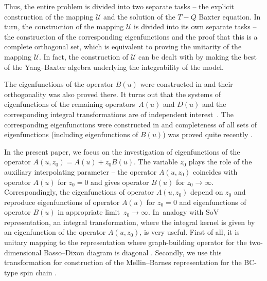 \documentclass[pdftex]{sigma}
\numberwithin{equation}{section}
\begin{document}
Thus, the entire problem is divided into two separate tasks -- the explicit
construction of the mapping $\mathcal{U}$ and the solution of the $T-Q$ Baxter equation.
In turn, the construction of the mapping $\mathcal{U}$ is divided into its own separate tasks -- the construction of the corresponding eigenfunctions and the proof that this is a complete orthogonal set, which is equivalent to proving the unitarity of the mapping $\mathcal{U}$. In fact, the construction of $\mathcal{U}$ can be dealt with by making the best of the Yang--Baxter algebra underlying the integrability of the model.

The eigenfunctions of the operator $B(u)$ were constructed in \cite{DKM} and
their orthogonality was also proved there.
It turns out that the systems of eigenfunctions of the remaining operators~$A(u)$
and $D(u)$ and the corresponding integral transformations are of
independent interest~\mbox{\cite{BDM,DKO, L4}}. The corresponding eigenfunctions were
constructed in \cite{DM2} and completeness of all sets of
eigenfunctions (including eigenfunctions of $B(u)$) was proved quite recently \cite{M}.

In the present paper, we focus on the investigation of eigenfunctions of the operator
$A(u,z_0) = A(u)+z_0 B(u)$.
The variable $z_0$ plays the role of the auxiliary interpolating parameter --
the operator $A(u,z_0)$ coincides with operator $A(u)$ for $z_0=0$ and gives operator $B(u)$ for $z_0 \to \infty$. Correspondingly,
the eigenfunctions of operator $A(u,z_0)$ depend on $z_0$ and reproduce
eigenfunctions of operator $A(u)$ for $z_0=0$ and eigenfunctions of operator
$B(u)$ in appropriate limit~${z_0 \to \infty}$.
In~analogy with SoV representation, an integral transformation,
where the integral kernel is given by an eigenfunction of the
operator $A(u,z_0)$, is very useful.
First of all, it is unitary mapping to the representation where graph-building operator
for the two-dimensional Basso--Dixon diagram is diagonal \cite{DKO}.
Secondly, we use this transformation for construction of the Mellin--Barnes representation for the BC-type spin chain \cite{ADV2}.
\end{document}
